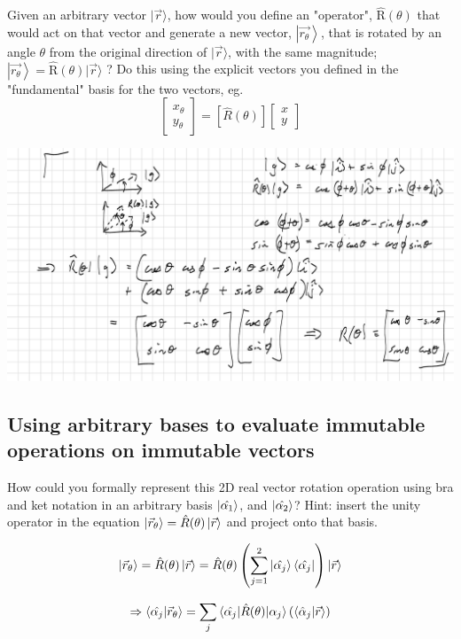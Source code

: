 \documentclass{article}
\begin{document}
Given an arbitrary vector $|\vec{r}\rangle$, how would you define an "operator", $\widehat{\mathrm{R}}(\theta)$ that would act on that vector and generate a new vector, $\left|\overrightarrow{r_{\theta}}\right\rangle$, that is rotated by an angle $\theta$ from the original direction of $|\vec{r}\rangle$, with the same magnitude; $\left|\overrightarrow{r_{\theta}}\right\rangle=\widehat{\mathrm{R}}(\theta)|\vec{r}\rangle$ ? Do this using the explicit vectors you defined in the "fundamental" basis for the two vectors, eg.
$$
\left[\begin{array}{l}
x_{\theta} \\
y_{\theta}
\end{array}\right]=[\hat{R}(\theta)]\left[\begin{array}{l}
x \\
y
\end{array}\right]
$$

\includegraphics[width = 0.98 \textwidth]{Lecture11/3.png}

\subsection{Using arbitrary bases to evaluate immutable operations on immutable vectors}

How could you formally represent this 2D real vector rotation operation using bra and ket notation in an arbitrary basis $\ket{\hat{\alpha_1}}$, and $\ket{\hat{\alpha_2}}$?  Hint: insert the unity operator in the equation $\ket{\vec{r}_\theta} = \hat{R}(\theta) \ket{\vec{r}}$ and project onto that basis.  

$$\ket{\vec{r}_\theta} = \hat{R}(\theta) \ket{\vec{r}} = \hat{R} (\theta) \left( \sum_{j=1}^2 \ket{\hat{\alpha_j}} \bra{\hat{\alpha_j}} \right) \ket{\vec{r}}$$

$$\Rightarrow \braket{\hat{\alpha_j} | \vec{r}_\theta} = \sum_j \braket{\hat{\alpha_j} | \hat{R}(\theta) | \alpha_j} \left( \braket{\hat{\alpha}_j | \vec{r}} \right)$$
\end{document}
